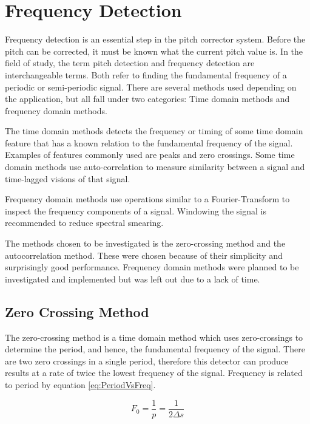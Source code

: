 \section{Frequency Detection}

Frequency detection is an essential step in the pitch corrector system. Before the
pitch can be corrected, it must be known what the current pitch value is. In the
field of study, the term pitch detection and frequency detection are
interchangeable terms. Both refer to finding the fundamental frequency of a
periodic or semi-periodic signal\cite{ComparitivePitch}. There are several methods
used depending on the application, but all fall under two categories: Time domain
methods and frequency domain methods\cite{PDABook}.

The time domain methods detects the frequency or timing of some time domain
feature that has a known relation to the fundamental frequency of the signal.
Examples of features commonly used are peaks and zero crossings. Some time domain
methods use auto-correlation to measure similarity between a signal and
time-lagged visions of that signal\cite{PDABook}.

Frequency domain methods use operations similar to a Fourier-Transform to inspect
the frequency components of a signal. Windowing the signal is recommended to
reduce spectral smearing\cite{Windowing}.

The methods chosen to be investigated is the zero-crossing method and the
autocorrelation method. These were chosen because of their simplicity and
surprisingly good performance\cite{ComparitivePitch}. Frequency domain methods
were planned to be investigated and implemented but was left out due to a lack of
time.

\subsection{Zero Crossing Method}

The zero-crossing method is a time domain method which uses zero-crossings to
determine the period, and hence, the fundamental frequency of the signal. There
are two zero crossings in a single period, therefore this detector can produce
results at a rate of twice the lowest frequency of the signal. Frequency is
related to period by equation \ref{eq:PeriodVsFreq}.

\begin{equation}\label{eq:PeriodVsFreq}
	F_0 = \frac{1}{p} = \frac{1}{2\Delta s}
\end{equation}

